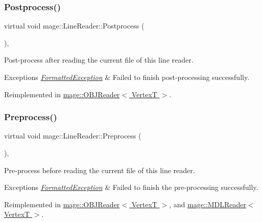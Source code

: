 \subsubsection{\texorpdfstring{Postprocess()}{Postprocess()}}
{\footnotesize\ttfamily virtual void mage\+::\+Line\+Reader\+::\+Postprocess (\begin{DoxyParamCaption}{ }\end{DoxyParamCaption})\hspace{0.3cm}{\ttfamily [private]}, {\ttfamily [virtual]}}

Post-\/process after reading the current file of this line reader.


\begin{DoxyExceptions}{Exceptions}
{\em \hyperlink{structmage_1_1_formatted_exception}{Formatted\+Exception}} & Failed to finish post-\/processing successfully. \\
\hline
\end{DoxyExceptions}


Reimplemented in \hyperlink{classmage_1_1_o_b_j_reader_a248977c8300575ed2bab04df26197919}{mage\+::\+O\+B\+J\+Reader$<$ Vertex\+T $>$}.

\hypertarget{classmage_1_1_line_reader_a4de135cfb0434be786cfcfd7959031ef}{}\label{classmage_1_1_line_reader_a4de135cfb0434be786cfcfd7959031ef} 
\subsubsection{\texorpdfstring{Preprocess()}{Preprocess()}}
{\footnotesize\ttfamily virtual void mage\+::\+Line\+Reader\+::\+Preprocess (\begin{DoxyParamCaption}{ }\end{DoxyParamCaption})\hspace{0.3cm}{\ttfamily [private]}, {\ttfamily [virtual]}}

Pre-\/process before reading the current file of this line reader.


\begin{DoxyExceptions}{Exceptions}
{\em \hyperlink{structmage_1_1_formatted_exception}{Formatted\+Exception}} & Failed to finish the pre-\/processing successfully. \\
\hline
\end{DoxyExceptions}


Reimplemented in \hyperlink{classmage_1_1_o_b_j_reader_ae3a3ad3b50f1dd8dffe3109fc7dc2937}{mage\+::\+O\+B\+J\+Reader$<$ Vertex\+T $>$}, and \hyperlink{classmage_1_1_m_d_l_reader_a8b99fb3bdea5e9dae156b135c160c22d}{mage\+::\+M\+D\+L\+Reader$<$ Vertex\+T $>$}.

